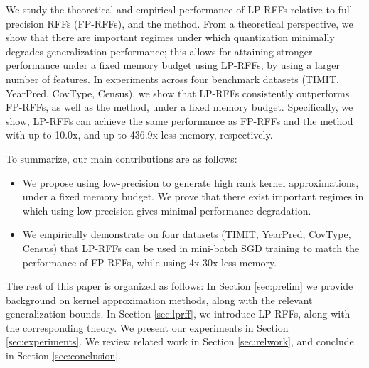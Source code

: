 We study the theoretical and empirical performance of LP-RFFs relative to full-precision RFFs (FP-RFFs), and the \Nystrom method.  From a theoretical perspective, we show that there are important regimes under which quantization minimally degrades generalization performance; this allows for attaining stronger performance under a fixed memory budget using LP-RFFs, by using a larger number of features. In experiments across four benchmark datasets (TIMIT, YearPred, CovType, Census), we show that LP-RFFs consistently outperforms FP-RFFs, as well as the \Nystrom method, under a fixed memory budget. Specifically, we show, LP-RFFs can achieve the same performance as FP-RFFs and the \Nystrom method with up to 10.0x, and up to 436.9x less memory, respectively.

To summarize, our main contributions are as follows:
\begin{itemize}
	\item We propose using low-precision to generate high rank kernel approximations, under a fixed memory budget. We prove that there exist important regimes in which using low-precision gives minimal performance degradation.
	\item We empirically demonstrate on four datasets (TIMIT, YearPred, CovType, Census) that LP-RFFs can be used in mini-batch SGD training to match the performance of FP-RFFs, while using 4x-30x less memory.
\end{itemize}

The rest of this paper is organized as follows:   In Section \ref{sec:prelim} we provide background on kernel approximation methods, along with the relevant generalization bounds. In Section \ref{sec:lprff}, we introduce LP-RFFs, along with the corresponding theory.  We present our experiments in Section \ref{sec:experiments}.  We review related work in Section \ref{sec:relwork}, and conclude in Section \ref{sec:conclusion}.



